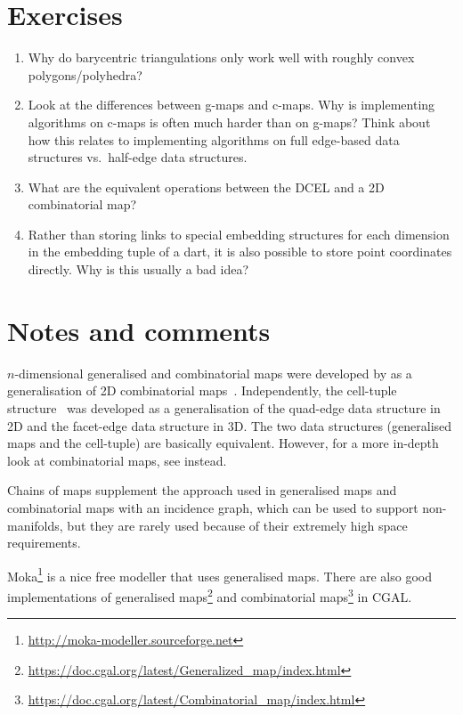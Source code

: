 %
\section{Exercises}

\begin{enumerate}
	\item Why do barycentric triangulations only work well with roughly convex polygons/polyhedra?
	\item Look at the differences between g-maps and c-maps. Why is implementing algorithms on c-maps is often much harder than on g-maps? Think about how this relates to implementing algorithms on full edge-based data structures vs.\ half-edge data structures.
	\item What are the equivalent operations between the DCEL and a 2D combinatorial map?
	\item Rather than storing links to special embedding structures for each dimension in the embedding tuple of a dart, it is also possible to store point coordinates directly. Why is this usually a bad idea?
\end{enumerate}



%
\section{Notes and comments}

\(n\)-dimensional generalised and combinatorial maps were developed by \citet{Lienhardt94} as a generalisation of 2D combinatorial maps~\citep{Edmonds60}.
Independently, the cell-tuple structure~\citep{Brisson89} was developed as a generalisation of the quad-edge \citep{Guibas85} data structure in 2D and the facet-edge data structure \citep{Dobkin87} in 3D.
The two data structures (generalised maps and the cell-tuple) are basically equivalent.
However, for a more in-depth look at combinatorial maps, see \citet{Damiand14} instead.

Chains of maps \citep{Elter94} supplement the approach used in generalised maps and combinatorial maps with an incidence graph, which can be used to support non-manifolds, but they are rarely used because of their extremely high space requirements.

Moka\footnote{\url{http://moka-modeller.sourceforge.net}} is a nice free modeller that uses generalised maps.
There are also good implementations of generalised maps\footnote{\url{https://doc.cgal.org/latest/Generalized_map/index.html}} and combinatorial maps\footnote{\url{https://doc.cgal.org/latest/Combinatorial_map/index.html}} in CGAL\@.
